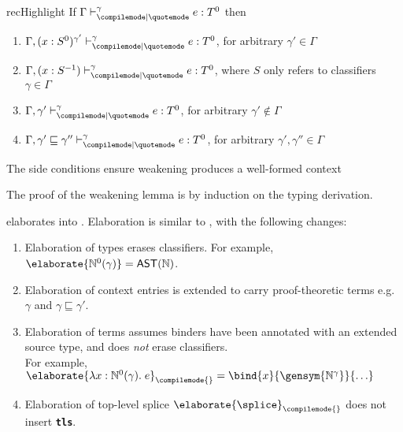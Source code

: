 \begin{lemma}{recHighlight}
  If $\rcqtypejudge{\gamma}{e}{T^0}$ then
  \begin{enumerate}
    \item $\rcqtypejudge[\Gamma, (x:S^0)^{\gamma'}]{\gamma}{e}{T^0}$, for arbitrary $\gamma' \in \Gamma$
    \item $\rcqtypejudge[\Gamma, (x:S^{-1})]{\gamma}{e}{T^0}$, where $S$ only refers to classifiers $\gamma \in \Gamma$
    \item $\rcqtypejudge[\Gamma, \gamma']{\gamma}{e}{T^0}$, for arbitrary $\gamma' \notin \Gamma$
    \item $\rcqtypejudge[\Gamma, \gamma' \sqsubseteq \gamma'']{\gamma}{e}{T^0}$, for arbitrary $\gamma', \gamma'' \in \Gamma$
  \end{enumerate}
  The side conditions ensure weakening produces a well-formed context
\end{lemma}
The proof of the weakening lemma is by induction on the typing derivation.

\recLang{} elaborates into \recCoreLang{}. Elaboration is similar to , with the following changes:
\begin{enumerate}
  \item Elaboration of types erases classifiers. For example,  $\elaborate{\mathbb{N}^0(\gamma)} = \textsf{AST}(\mathbb{N})$.
  \item Elaboration of context entries is extended to carry proof-theoretic terms e.g. $\gamma$ and $\gamma \sqsubseteq \gamma'$.
  \item Elaboration of terms assumes binders have been annotated with an extended source type, and does \textit{not} erase classifiers. \\
  For example, $\elaborate{\lambda x: {\mathbb{N}^0({\gamma})}. \; e}_{\compilemode{}} = \bind{x}{\gensym{\mathbb{N}^{\gamma}}}{\ldots}$
  \item Elaboration of top-level splice $\elaborate{\splice}_{\compilemode{}}$ does not insert \textbf{\texttt{tls}}.
\end{enumerate}

